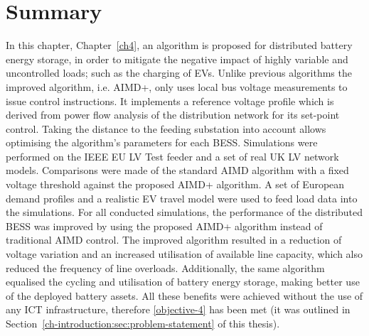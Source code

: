 \section{Summary}
\label{ch4:sec:summary}

In this chapter, Chapter~\ref{ch4}, an algorithm is proposed for distributed battery energy storage, in order to mitigate the negative impact of highly variable and uncontrolled loads; such as the charging of EVs.
Unlike previous algorithms the improved algorithm, i.e. AIMD+, only uses local bus voltage measurements to issue control instructions.
It implements a reference voltage profile which is derived from power flow analysis of the distribution network for its set-point control.
Taking the distance to the feeding substation into account allows optimising the algorithm's parameters for each BESS.
Simulations were performed on the IEEE EU LV Test feeder and a set of real UK LV network models.
Comparisons were made of the standard AIMD algorithm with a fixed voltage threshold against the proposed AIMD+ algorithm.
A set of European demand profiles and a realistic EV travel model were used to feed load data into the simulations.
For all conducted simulations, the performance of the distributed BESS was improved by using the proposed AIMD+ algorithm instead of traditional AIMD control.
The improved algorithm resulted in a reduction of voltage variation and an increased utilisation of available line capacity, which also reduced the frequency of line overloads.
Additionally, the same algorithm equalised the cycling and utilisation of battery energy storage, making better use of the deployed battery assets.
All these benefits were achieved without the use of any ICT infrastructure, therefore \ref{objective-4} has been met (it was outlined in Section~\ref{ch-introduction:sec:problem-statement} of this thesis).